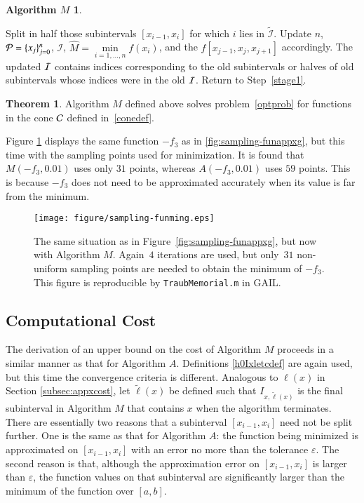 \documentclass[review]{elsarticle}
\newcommand{\abstol}{\varepsilon}
\theoremstyle{definition}
\newtheorem*{algoM}{Algorithm $M$}
\newcommand{\tell}{\tilde{\ell}}
\newcommand{\hM}{\widehat{M}}
\newtheorem{theorem}{Theorem}
\newcommand{\minfi}{\min\limits_{i=1, \ldots,  n} f(x_i)} %
\begin{document}
\begin{algoM}
\begin{enumerate}[\em Step 1.]
		Split in half those subintervals $[x_{i-1},x_i]$ for which $i$ lies in
		$\widetilde{\mathcal{I}}$. Update $n$, $\mathcal{P} = \{x_j\}_{j=0}^n$, $\mathcal{I}$,
		$\hM = \minfi$, and the $f[x_{j-1}, x_{j}, x_{j+1}]$ accordingly. The updated
		$\mathcal{I}$ contains indices corresponding to the old subintervals or halves of old
		subintervals whose indices were in the old $\mathcal{I}$. Return to Step~\ref{stage1}.
	\end{enumerate}
\end{algoM}

\begin{theorem} \label{thm:algMworks}
Algorithm $M$ defined above solves problem~\eqref{optprob} for functions in the
cone $\mathcal{C}$ defined in~\eqref{conedef}.
\end{theorem}

Figure \ref{fig:sampling-funming} displays the same function $-f_3$ as in
\ref{fig:sampling-funappxg}, but this time with the sampling points used for
minimization. It is found that $M(-f_3,0.01)$ uses only $31$ points, whereas
$A(-f_3,0.01)$ uses $59$ points. This is because $-f_3$ does not need to be
approximated accurately when its value is far from the minimum.


\begin{figure}[tbh]
\centering
\texttt{[image: figure/sampling-funming.eps]}
\caption{The same situation as in Figure~\ref{fig:sampling-funappxg}, but now
with Algorithm $M$. Again~$4$ iterations are used, but only~$31$ non-uniform
sampling points are needed to obtain the minimum of $-f_3$. This figure is
reproducible by {\tt TraubMemorial.m} in GAIL.} \label{fig:sampling-funming}
\end{figure}

\subsection{Computational Cost} \label{subsec:optcost}
The derivation of an upper bound on the cost of Algorithm $M$ proceeds in a
similar manner as that for Algorithm $A$. Definitions \eqref{h0Ixletcdef} are
again used, but this time the convergence criteria is different. Analogous to
$\ell(x)$ in Section \ref{subsec:appxcost}, let $\tell(x)$ be defined such that
$I_{x,\tell(x)}$ is the final subinterval in Algorithm $M$ that contains $x$
when the algorithm terminates. There are essentially two reasons that a
subinterval $[x_{i-1},x_i]$ need not be split further. One is the same as that
for Algorithm $A$: the function being minimized is approximated on
$[x_{i-1},x_i]$ with an error no more than the tolerance $\abstol$. The second
reason is that, although the approximation error on $[x_{i-1},x_i]$ is larger
than $\abstol$, the function values on that subinterval are significantly larger
than the minimum of the function over $[a,b]$.
\end{document}
